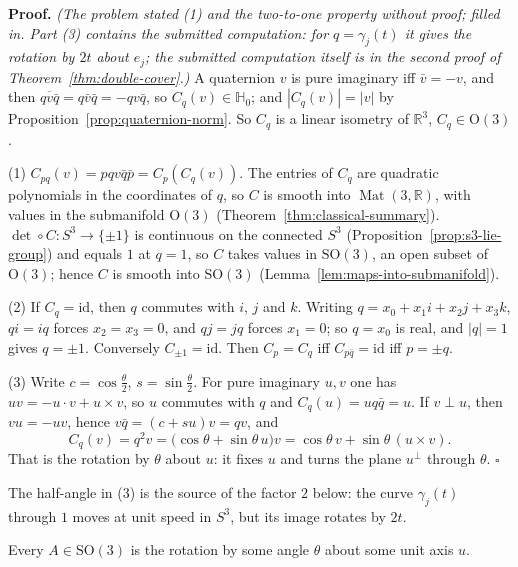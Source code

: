 \documentclass[11pt]{report}
\makeatletter
\newcounter{thmcounter}[section]
\renewenvironment{proof}[1][Proof]{\noindent\textbf{#1.} }{\hfill$\square$\par\vspace{5pt}}
\newcommand{\thmlabel}[1]{\edef\@currentlabel{\arabic{section}.\arabic{thmcounter}}\label{#1}}
\newcommand{\Ogp}{\mathrm{O}}
\newcommand{\SO}{\mathrm{SO}}
\DeclareMathOperator{\Mat}{Mat}
\makeatother
\begin{document}
\begin{proof}
\textit{(The problem stated (1) and the two-to-one property without proof; filled in. Part (3) contains the submitted computation: for $q = \gamma_j(t)$ it gives the rotation by $2t$ about $e_j$; the submitted computation itself is in the second proof of Theorem~\ref{thm:double-cover}.)} A quaternion $v$ is pure imaginary iff $\bar v = -v$, and then $\overline{q v \bar q} = q \bar v \bar q = -q v \bar q$, so $C_q(v) \in \mathbb{H}_0$; and $|C_q(v)| = |v|$ by Proposition~\ref{prop:quaternion-norm}. So $C_q$ is a linear isometry of $\mathbb{R}^3$, $C_q \in \Ogp(3)$.

(1) $C_{pq}(v) = pq v \bar q \bar p = C_p(C_q(v))$. The entries of $C_q$ are quadratic polynomials in the coordinates of $q$, so $C$ is smooth into $\Mat(3, \mathbb{R})$, with values in the submanifold $\Ogp(3)$ (Theorem~\ref{thm:classical-summary}). $\det \circ C : S^3 \to \{\pm 1\}$ is continuous on the connected $S^3$ (Proposition~\ref{prop:s3-lie-group}) and equals $1$ at $q = 1$, so $C$ takes values in $\SO(3)$, an open subset of $\Ogp(3)$; hence $C$ is smooth into $\SO(3)$ (Lemma~\ref{lem:maps-into-submanifold}).

(2) If $C_q = \mathrm{id}$, then $q$ commutes with $i$, $j$ and $k$. Writing $q = x_0 + x_1 i + x_2 j + x_3 k$, $qi = iq$ forces $x_2 = x_3 = 0$, and $qj = jq$ forces $x_1 = 0$; so $q = x_0$ is real, and $|q| = 1$ gives $q = \pm 1$. Conversely $C_{\pm 1} = \mathrm{id}$. Then $C_p = C_q$ iff $C_{p\bar q} = \mathrm{id}$ iff $p = \pm q$.

(3) Write $c = \cos\frac\theta2$, $s = \sin\frac\theta2$. For pure imaginary $u, v$ one has $uv = -u\cdot v + u \times v$, so $u$ commutes with $q$ and $C_q(u) = u q \bar q = u$. If $v \perp u$, then $vu = -uv$, hence $v\bar q = (c + su) v = qv$, and
\[
C_q(v) = q^2 v = \big(\cos\theta + \sin\theta\, u\big) v = \cos\theta\, v + \sin\theta\, (u \times v) .
\]
That is the rotation by $\theta$ about $u$: it fixes $u$ and turns the plane $u^\perp$ through $\theta$.
\end{proof}

The half-angle in (3) is the source of the factor $2$ below: the curve $\gamma_j(t)$ through $1$ moves at unit speed in $S^3$, but its image rotates by $2t$.

\begin{lembox}\thmlabel{lem:euler-axis}
Every $A \in \SO(3)$ is the rotation by some angle $\theta$ about some unit axis $u$.
\end{lembox}
\end{document}
